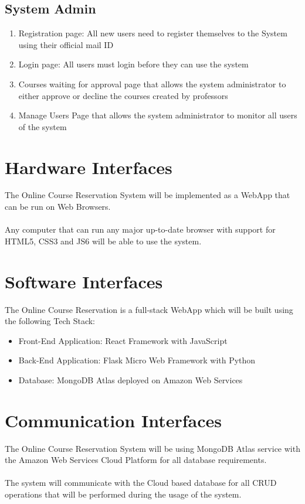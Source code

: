 \documentclass[12pt, a4]{report}
\begin{document}
\subsection{System Admin}
\begin{enumerate}
    \item Registration page: All new users need to register themselves to the System using their official mail ID
    \item Login page: All users must login before they can use the system
    \item Courses waiting for approval page that allows the system administrator to either approve or decline the courses created by professors
    \item Manage Users Page that allows the system administrator to monitor all users of the system
\end{enumerate}

\section{Hardware Interfaces}
The Online Course Reservation System will be implemented as a WebApp that can be run on Web Browsers.
\\\\
Any computer that can run any major up-to-date browser with support for HTML5, CSS3 and JS6 will be able to use the system.

\section{Software Interfaces}
The Online Course Reservation is a full-stack WebApp which will be built using the following Tech Stack:
\begin{itemize}
    \item Front-End Application: React Framework with JavaScript
    \item Back-End Application: Flask Micro Web Framework with Python
    \item Database: MongoDB Atlas deployed on Amazon Web Services
\end{itemize}

\section{Communication Interfaces}
The Online Course Reservation System will be using MongoDB Atlas service with the Amazon Web Services Cloud Platform for all database requirements.
\\\\
The system will communicate with the Cloud based database for all CRUD operations that will be performed during the usage of the system.
\end{document}
